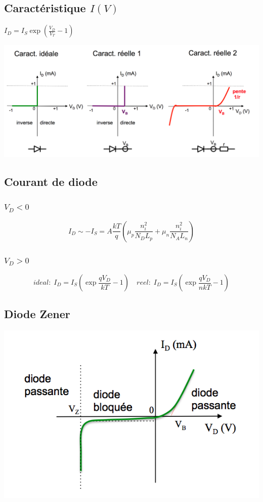 \documentclass[]{article}
\begin{document}
\subsection{Caractéristique $I(V)$}
$ I_D = I_S \exp{(\frac{V_D}{V_T}-1)} $

\includegraphics[scale=0.3]{car}

\subsection{Courant de diode}
\subsubsection{$V_D < 0$}
$$ I_D \sim - I_S = A\frac{kT}{q}(\mu_p\frac{n_i^2}{N_DL_p}+\mu_n\frac{n_i^2}{N_AL_n}) $$

\subsubsection{$V_D > 0$}

$$ ideal : \; I_D = I_S(\exp {\frac{qV_D}{kT}} -1) \quad reel : \;  I_D = I_S(\exp {\frac{qV_D}{nkT}} -1) $$

\subsection{Diode Zener}
\includegraphics[scale=0.8]{zener_IV.png} 
\end{document}
